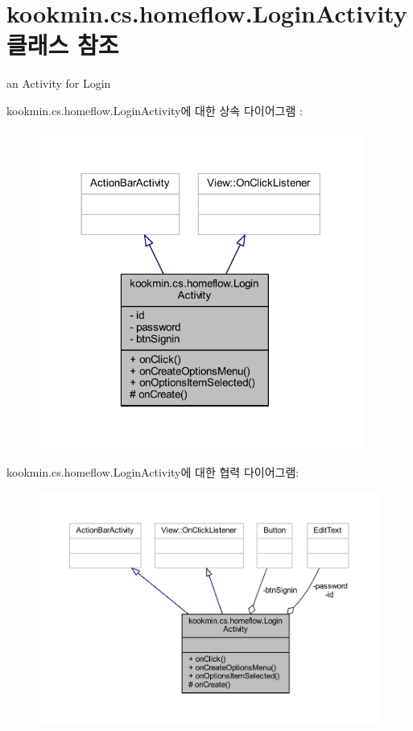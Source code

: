 \hypertarget{classkookmin_1_1cs_1_1homeflow_1_1_login_activity}{}\section{kookmin.\+cs.\+homeflow.\+Login\+Activity 클래스 참조}
\label{classkookmin_1_1cs_1_1homeflow_1_1_login_activity}


an Activity for Login  




kookmin.\+cs.\+homeflow.\+Login\+Activity에 대한 상속 다이어그램 \+: \nopagebreak
\begin{figure}[H]
\begin{center}
\leavevmode
\includegraphics[width=302pt]{classkookmin_1_1cs_1_1homeflow_1_1_login_activity__inherit__graph}
\end{center}
\end{figure}


kookmin.\+cs.\+homeflow.\+Login\+Activity에 대한 협력 다이어그램\+:\nopagebreak
\begin{figure}[H]
\begin{center}
\leavevmode
\includegraphics[width=350pt]{classkookmin_1_1cs_1_1homeflow_1_1_login_activity__coll__graph}
\end{center}
\end{figure}
